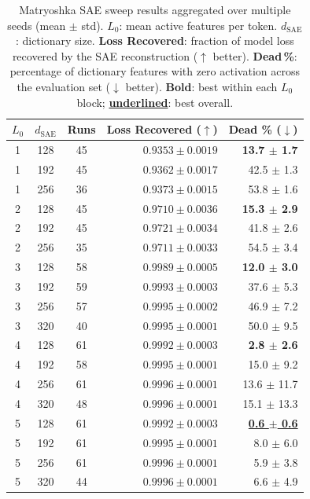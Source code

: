 \begin{table}[htbp]
\centering
\caption{Matryoshka SAE sweep results aggregated over multiple seeds (mean $\pm$ std). $L_0$: mean active features per token. $d_\text{SAE}$: dictionary size. \textbf{Loss Recovered}: fraction of model loss recovered by the SAE reconstruction ($\uparrow$ better). \textbf{Dead\,\%}: percentage of dictionary features with zero activation across the evaluation set ($\downarrow$ better).
\textbf{Bold}: best within each $L_0$ block; \underline{\textbf{underlined}}: best overall.}
\label{tab:matryoshka_sae_sweep}
\begin{tabular}{cccrr}
\toprule
$L_0$ & $d_\text{SAE}$ & Runs & Loss Recovered ($\uparrow$) & Dead \% ($\downarrow$) \\
\midrule
  1 & 128 & 45 & $0.9353 \pm 0.0019$ & \textbf{13.7 $\pm$ 1.7} \\
  1 & 192 & 45 & $0.9362 \pm 0.0017$ & 42.5 $\pm$ 1.3 \\
  1 & 256 & 36 & $\mathbf{0.9373 \pm 0.0015}$ & 53.8 $\pm$ 1.6 \\
\midrule
  2 & 128 & 45 & $0.9710 \pm 0.0036$ & \textbf{15.3 $\pm$ 2.9} \\
  2 & 192 & 45 & $\mathbf{0.9721 \pm 0.0034}$ & 41.8 $\pm$ 2.6 \\
  2 & 256 & 35 & $0.9711 \pm 0.0033$ & 54.5 $\pm$ 3.4 \\
\midrule
  3 & 128 & 58 & $0.9989 \pm 0.0005$ & \textbf{12.0 $\pm$ 3.0} \\
  3 & 192 & 59 & $0.9993 \pm 0.0003$ & 37.6 $\pm$ 5.3 \\
  3 & 256 & 57 & $\mathbf{0.9995 \pm 0.0002}$ & 46.9 $\pm$ 7.2 \\
  3 & 320 & 40 & $\mathbf{0.9995 \pm 0.0001}$ & 50.0 $\pm$ 9.5 \\
\midrule
  4 & 128 & 61 & $0.9992 \pm 0.0003$ & \textbf{2.8 $\pm$ 2.6} \\
  4 & 192 & 58 & $0.9995 \pm 0.0001$ & 15.0 $\pm$ 9.2 \\
  4 & 256 & 61 & \underline{$\mathbf{0.9996 \pm 0.0001}$} & 13.6 $\pm$ 11.7 \\
  4 & 320 & 48 & \underline{$\mathbf{0.9996 \pm 0.0001}$} & 15.1 $\pm$ 13.3 \\
\midrule
  5 & 128 & 61 & $0.9992 \pm 0.0003$ & \underline{\textbf{0.6 $\pm$ 0.6}} \\
  5 & 192 & 61 & $0.9995 \pm 0.0001$ & 8.0 $\pm$ 6.0 \\
  5 & 256 & 61 & \underline{$\mathbf{0.9996 \pm 0.0001}$} & 5.9 $\pm$ 3.8 \\
  5 & 320 & 44 & \underline{$\mathbf{0.9996 \pm 0.0001}$} & 6.6 $\pm$ 4.9 \\
\bottomrule
\end{tabular}
\end{table}
